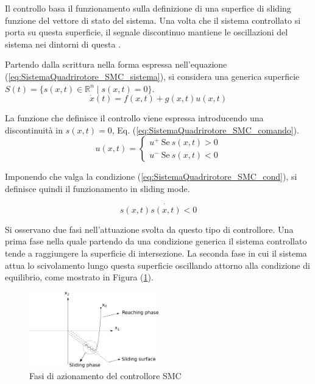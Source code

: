 Il controllo basa il funzionamento sulla definizione di una superfice di sliding funzione del vettore di stato del sistema. Una volta che il sistema controllato si porta su questa superficie, il segnale discontinuo mantiene le oscillazioni del sistema nei dintorni di questa \cite{DesTestCarm}.

Partendo dalla scrittura nella forma espressa nell'equazione (\ref{eq:SistemaQuadrirotore_SMC_sistema}), si considera una generica superficie $S(t) = \{ s(x,t) \in \mathbb{R}^n  \mid s(x,t) = 0\}$.
\begin{equation}\label{eq:SistemaQuadrirotore_SMC_sistema}
	\dot{x}(t) = f(x,t) +g(x,t) u(x,t)
\end{equation}

La funzione che definisce il controllo viene espressa introducendo una discontinuità in $s(x,t)=0$, Eq. (\ref{eq:SistemaQuadrirotore_SMC_comando}).
\begin{equation}\label{eq:SistemaQuadrirotore_SMC_comando}
	u(x,t) = \begin{cases}
		u^+ \ \text{Se} \ s(x,t) > 0 \\
		u^- \ \text{Se} \ s(x,t) < 0
	\end{cases}
\end{equation}

Imponendo che valga la condizione (\ref{eq:SistemaQuadrirotore_SMC_cond}), si definisce quindi il funzionamento in sliding mode.

\begin{equation}\label{eq:SistemaQuadrirotore_SMC_cond}
	s(x,t) \dot{s(x,t)} < 0
\end{equation}

Si osservano due fasi nell'attuazione svolta da questo tipo di controllore. Una prima fase nella quale partendo da una condizione generica il sistema controllato tende a raggiungere la superficie di intersezione. La seconda fase in cui il sistema attua lo scivolamento lungo questa superficie oscillando attorno alla condizione di equilibrio, come mostrato in Figura (\ref{fig:SMC}).

\begin{figure}
	\centering
	\includegraphics[width=0.5\textwidth]{SistemaQuadrirotore/Figure/SMC_fasi}
	\caption{Fasi di azionamento del controllore SMC \cite{LiShihua2017AiVS}}
	\label{fig:SMC}
\end{figure}

